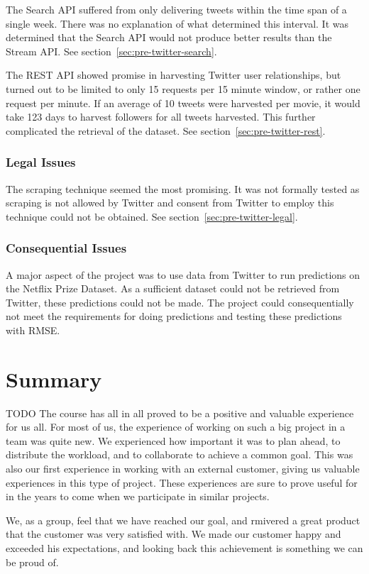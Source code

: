 The Search API suffered from only delivering tweets within the time span of a single week. There was no explanation of what determined this interval. It was determined that the Search API would not produce better results than the Stream API. See section~\ref{sec:pre-twitter-search}.

The REST API showed promise in harvesting Twitter user relationships, but turned out to be limited to only 15 requests per 15 minute window, or rather one request per minute. If an average of 10 tweets were harvested per movie, it would take 123 days to harvest followers for all tweets harvested. This further complicated the retrieval of the dataset. See section~\ref{sec:pre-twitter-rest}.

\subsubsection{Legal Issues}
The scraping technique seemed the most promising. It was not formally tested as scraping is not allowed by Twitter and consent from Twitter to employ this technique could not be obtained. See section~\ref{sec:pre-twitter-legal}.

\subsubsection{Consequential Issues}
A major aspect of the project was to use data from Twitter to run predictions on the Netflix Prize Dataset. As a sufficient dataset could not be retrieved from Twitter, these predictions could not be made. The project could consequentially not meet the requirements for doing predictions and testing these predictions with RMSE.


\section{Summary}
TODO
The course has all in all proved to be a positive and valuable experience for us all. For most of us, the experience of working on such a big project in a team was quite new. We experienced how important it was to plan ahead, to distribute the workload, and to collaborate to achieve a common goal. This was also our first experience in working with an external customer, giving us valuable experiences in this type of project. These experiences are sure to prove useful for in the years to come when we participate in similar projects.

We, as a group, feel that we have reached our goal, and rmivered a great product that the customer was very satisfied with. We made our customer happy and exceeded his expectations, and looking back this achievement is something we can be proud of.
